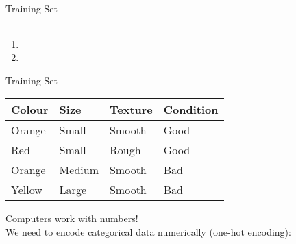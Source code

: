 \documentclass[usenames,dvipsnames]{beamer}
\begin{document}
\begin{frame}{Training Set}
{\begin{table}[]
\begin{tabular}{|l|l|l||l|}
	\end{tabular}
\end{table}
}

\begin{enumerate}
	\item {}
	\item{}
\end{enumerate}
\end{frame}

\begin{frame}{Training Set}
\vspace{-5pt}
\begin{table}[]
	\begin{tabular}{|l|l|l||l|}
		\hline 
		\rowcolor{white}
		\cellcolor{Lavender}\textbf{Colour} & \cellcolor{Lavender}\textbf{Size} & \cellcolor{Lavender}\textbf{Texture} & \cellcolor{Tan}\textbf{Condition} \\ \hline 
		\cellcolor{Lavender}Orange & \cellcolor{Lavender}Small & \cellcolor{Lavender}Smooth  & \cellcolor{Tan}Good      \\
		\cellcolor{Lavender}Red    & \cellcolor{Lavender}Small  & \cellcolor{Lavender}Rough  & \cellcolor{Tan}Good \\
		\cellcolor{Lavender}Orange & \cellcolor{Lavender}Medium & \cellcolor{Lavender}Smooth & \cellcolor{Tan}Bad \\
		\cellcolor{Lavender}Yellow & \cellcolor{Lavender}Large  & \cellcolor{Lavender}Smooth & \cellcolor{Tan}Bad \\ \hline 
		
	\end{tabular}
\end{table}

\pause Computers work with numbers!\\
We need to encode categorical data numerically (one-hot encoding):


\end{frame}
\end{document}
